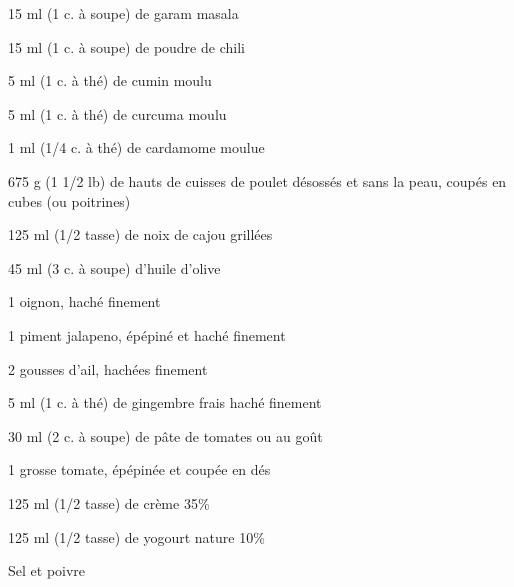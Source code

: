 


\totaltime{}


\begin{ingredients}
    \item[] 
    \item 15 ml (1 c. à soupe) de garam masala
    \item 15 ml (1 c. à soupe) de poudre de chili
    \item 5 ml (1 c. à thé) de cumin moulu
    \item 5 ml (1 c. à thé) de curcuma moulu
    \item 1 ml (1/4 c. à thé) de cardamome moulue
    \item[] 
    \item 675 g (1 1/2 lb) de hauts de cuisses de poulet désossés et sans la peau, coupés en cubes (ou poitrines)
    \item 125 ml (1/2 tasse) de noix de cajou grillées
    \item 45 ml (3 c. à soupe) d'huile d'olive
    \item 1 oignon, haché finement
    \item 1 piment jalapeno, épépiné et haché finement
    \item 2 gousses d'ail, hachées finement
    \item 5 ml (1 c. à thé) de gingembre frais haché finement
    \item 30 ml (2 c. à soupe) de pâte de tomates ou au goût
    \item 1 grosse tomate, épépinée et coupée en dés
    \item 125 ml (1/2 tasse) de crème 35\%
    \item 125 ml (1/2 tasse) de yogourt nature 10\%
    \item Sel et poivre
\end{ingredients}

